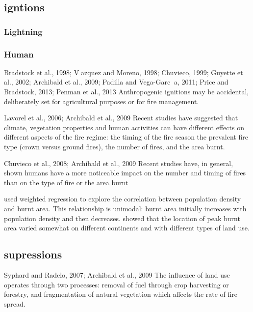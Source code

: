 \subsection{igntions}

\subsubsection{Lightning}

\subsubsection{Human}
Bradstock et al., 1998; Vazquez and
Moreno, 1998; Chuvieco, 1999; Guyette et al., 2002; Archibald et al., 2009; Padilla and
Vega-Garca, 2011; Price and Bradstock, 2013; Penman et al., 2013
Anthropogenic ignitions may be accidental, deliberately set
for agricultural purposes or for fire management. 

Lavorel et al., 2006; Archibald et al., 2009
Recent studies have suggested that climate, vegetation properties and human activities can have different effects on different aspects of the fire regime:      the timing of the fire season
    the prevalent fire type (crown versus ground fires),
    the number of fires,
    and the area burnt. 

Chuvieco et al., 2008; Archibald et al., 2009
Recent studies have, in general, shown humans have a more noticeable impact on the number and timing of fires than on the type of fire or the area burnt

\citet{bistinas2013relationships}
used weighted regression to explore the correlation between population density and burnt area. This relationship is unimodal: burnt area initially increases with population density and then decreases. \citet{bistinas2013relationships} showed that the location of peak burnt area varied somewhat on different continents and with different types of land use.

\subsection{supressions}
Syphard  and  Radelo,  2007;  Archibald  et  al.,  2009
The influence of land use operates through two processes:  removal of fuel through crop harvesting or forestry, and fragmentation of natural vegetation which affects the rate of fire spread.  

